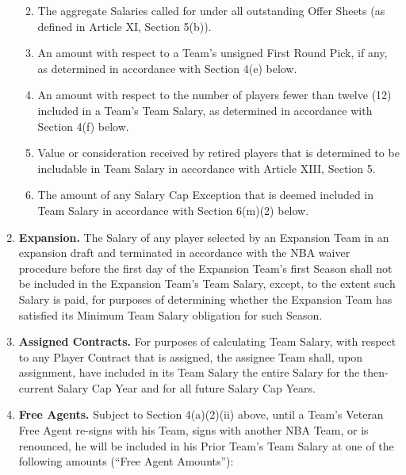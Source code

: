 \documentclass[
]{book}
\begin{document}
\begin{enumerate}
\begin{enumerate}
\begin{enumerate}
    \end{enumerate}
  \item
    The aggregate Salaries called for under all outstanding Offer Sheets (as defined in Article XI, Section 5(b)).
  \item
    An amount with respect to a Team's unsigned First Round Pick, if any, as determined in accordance with Section 4(e) below.
  \item
    An amount with respect to the number of players fewer than twelve (12) included in a Team's Team Salary, as determined in accordance with Section 4(f) below.
  \item
    Value or consideration received by retired players that is determined to be includable in Team Salary in accordance with Article XIII, Section 5.
  \item
    The amount of any Salary Cap Exception that is deemed included in Team Salary in accordance with Section 6(m)(2) below.
  \end{enumerate}
\item
  \textbf{Expansion.} The Salary of any player selected by an Expansion Team in an expansion draft and terminated in accordance with the NBA waiver procedure before the first day of the Expansion Team's first Season shall not be included in the Expansion Team's Team Salary, except, to the extent such Salary is paid, for purposes of determining whether the Expansion Team has satisfied its Minimum Team Salary obligation for such Season.
\item
  \textbf{Assigned Contracts.} For purposes of calculating Team Salary, with respect to any Player Contract that is assigned, the assignee Team shall, upon assignment, have included in its Team Salary the entire Salary for the then-current Salary Cap Year and for all future Salary Cap Years.
\item
  \textbf{Free Agents.} Subject to Section 4(a)(2)(ii) above, until a Team's Veteran Free Agent re-signs with his Team, signs with another NBA Team, or is renounced, he will be included in his Prior Team's Team Salary at one of the following amounts (``Free Agent Amounts''):


\end{enumerate}
\end{document}

